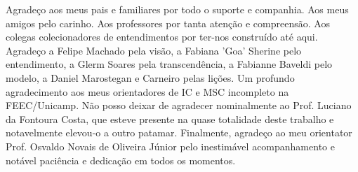     Agradeço aos meus pais e familiares por todo o suporte e companhia. Aos
meus amigos pelo carinho. Aos professores por tanta atenção e compreensão.
Aos colegas colecionadores de entendimentos por ter-nos construído até aqui.
Agradeço a Felipe Machado pela visão, a Fabiana 'Goa' Sherine pelo entendimento,
a Glerm Soares pela transcendência, a Fabianne Baveldi pelo modelo, a Daniel
Marostegan e Carneiro pelas lições. Um profundo agradecimento aos meus orientadores de IC
e MSC incompleto na FEEC/Unicamp. Não posso deixar de agradecer nominalmente
ao Prof. Luciano da Fontoura Costa, que esteve presente na quase totalidade deste
trabalho e notavelmente elevou-o a outro patamar. Finalmente, agradeço ao meu 
orientator Prof. Osvaldo Novais de Oliveira Júnior pelo inestimável acompanhamento
e notável paciência e dedicação em todos os momentos.
